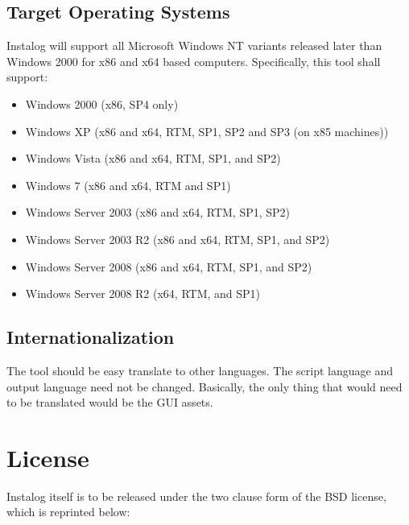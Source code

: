 \documentclass[letterpaper,12pt]{article}
\begin{document}
\subsection{Target Operating Systems}
Instalog will support all Microsoft Windows NT variants released later than
Windows 2000 for x86 and x64 based computers.  Specifically, this tool shall
support:
\begin{itemize}
  \item Windows 2000 (x86, SP4 only)
  \item Windows XP (x86 and x64, RTM, SP1, SP2 and SP3 (on x85 machines))
  \item Windows Vista (x86 and x64, RTM, SP1, and SP2)
  \item Windows 7 (x86 and x64, RTM and SP1)
  \item Windows Server 2003 (x86 and x64, RTM, SP1, SP2)
  \item Windows Server 2003 R2 (x86 and x64, RTM, SP1, and SP2)
  \item Windows Server 2008 (x86 and x64, RTM, SP1, and SP2)
  \item Windows Server 2008 R2 (x64, RTM, and SP1)
\end{itemize}

\subsection{Internationalization}
The tool should be easy translate to other languages.  The script language and
output language need not be changed.  Basically, the only thing that would need
to be translated would be the GUI assets.  

\newpage



\appendix
\section{License} \label{license}
Instalog itself is to be released under the two clause form of the BSD license,
which is reprinted below:
\end{document}
